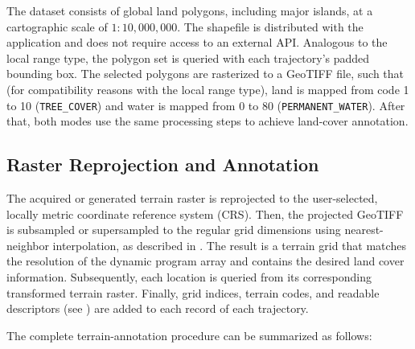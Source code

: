 The dataset consists of global land polygons, including major islands, at a cartographic scale of $1{:}10,000,000$.
The shapefile is distributed with the application and does not require access to an external API\@.
Analogous to the local range type, the polygon set is queried with each trajectory's padded bounding box.
The selected polygons are rasterized to a GeoTIFF file, such that (for compatibility reasons with the local range type),
land is mapped from code 1 to 10 (\texttt{TREE\_COVER}) and water is mapped from 0 to 80 (\texttt{PERMANENT\_WATER}).
After that, both modes use the same processing steps to achieve land-cover annotation.

\subsection{Raster Reprojection and Annotation}
\label{subsec:raster-reprojection-and-annotation}
The acquired or generated terrain raster is reprojected to the user-selected, locally metric coordinate reference system (CRS).
Then, the projected GeoTIFF is subsampled or supersampled to the regular grid dimensions using nearest-neighbor interpolation, as described in .
The result is a terrain grid that matches the resolution of the dynamic program array and contains the desired land cover information.
Subsequently, each location is queried from its corresponding transformed terrain raster.
Finally, grid indices, terrain codes, and readable descriptors (see ) are added to each record of each trajectory.


The complete terrain-annotation procedure can be summarized as follows:


